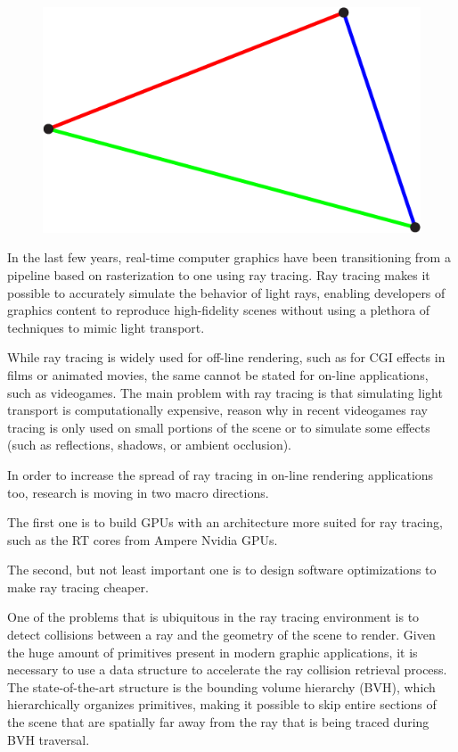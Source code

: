 \documentclass{PoliMi_MasterThesis}
\newcommand*\triangleLogo{
	\clearpage
	\thispagestyle{empty}
	\newpage
	\begin{figure}
		\centering
		\includegraphics[width=\textwidth]{Images/triangle_logo_thin.png} 
	\end{figure}
}
\begin{document}


\pagestyle{empty} %
\frontmatter %



\startpreamble
\triangleLogo
\setcounter{page}{1} %

\makeatletter
\let\savedchap\@makechapterhead
\def\@makechapterhead{\vspace*{-3cm}\savedchap}
\let\@makechapterhead\savedchap
\makeatletter
\small
In the last few years, real-time computer graphics have been transitioning from a pipeline based on rasterization to one using ray tracing.
Ray tracing makes it possible to accurately simulate the behavior of light rays, enabling developers of graphics content to reproduce high-fidelity scenes without using a plethora of techniques to mimic light transport.

While ray tracing is widely used for off-line rendering, such as for CGI effects in films or animated movies, the same cannot be stated for on-line applications, such as videogames. The main problem with ray tracing is that simulating light transport is computationally expensive, reason why in recent videogames ray tracing is only used on small portions of the scene or to simulate some effects (such as reflections, shadows, or ambient occlusion).

In order to increase the spread of ray tracing in on-line rendering applications too, research is moving in two macro directions.

The first one is to build GPUs with an architecture more suited for ray tracing, such as the RT cores from Ampere Nvidia GPUs.

The second, but not least important one is to design software optimizations to make ray tracing cheaper.

One of the problems that is ubiquitous in the ray tracing environment is to detect collisions between a ray and the geometry of the scene to render. Given the huge amount of primitives present in modern graphic applications, it is necessary to use a data structure to accelerate the ray collision retrieval process. The state-of-the-art structure is the bounding volume hierarchy (BVH), which hierarchically organizes primitives, making it possible to skip entire sections of the scene that are spatially far away from the ray that is being traced during BVH traversal.
\end{document}
